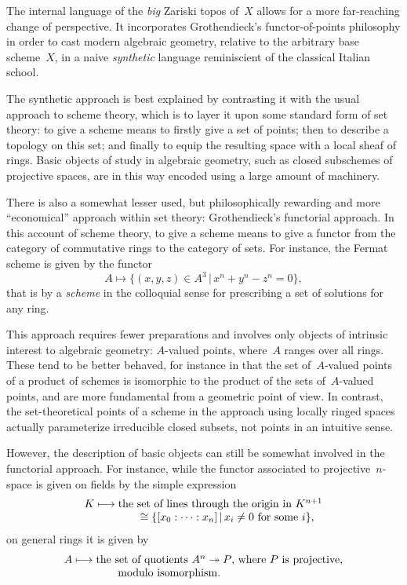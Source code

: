 \documentclass[10pt,reqno,a4paper]{amsbook}
\theoremstyle{definition}
\theoremstyle{plain}
\theoremstyle{remark}
\newcommand{\?}{\,{:}\,}
\renewcommand{\_}{\mathpunct{.}\,}
\begin{document}
{The internal language of the \emph{big} Zariski topos of~$X$ allows for a more far-reaching
change of perspective. It incorporates Grothendieck's functor-of-points
philosophy in order to cast modern algebraic geometry, relative to the arbitrary
base scheme~$X$, in a naive \emph{synthetic} language reminiscient of the classical
Italian school.

The synthetic approach is best explained by contrasting it with the usual
approach to scheme theory, which is to layer it upon some standard form of set theory:
to give a scheme means to firstly give a set of points; then
to describe a topology on this set; and finally to equip the resulting space
with a local sheaf of rings. Basic objects of study in algebraic geometry, such
as closed subschemes of projective spaces, are in this way encoded using a large
amount of machinery.

There is also a somewhat lesser used, but philosophically rewarding and more
``economical'' approach within set theory: Grothendieck's functorial approach.
In this account of scheme theory, to give a scheme means to give a functor
from the category of commutative rings to the category of sets. For instance,
the Fermat scheme is given by the functor
\[ A \longmapsto \{ (x,y,z) \in A^3 \,|\, x^n + y^n - z^n = 0 \}, \]
that is by a \emph{scheme} in the colloquial sense for prescribing a set of
solutions for any ring.

This approach requires fewer preparations and involves
only objects of intrinsic interest to algebraic geometry: $A$-valued points,
where~$A$ ranges over all rings. These tend to be better behaved, for instance in
that the set of~$A$-valued points of a product of schemes is isomorphic to the
product of the sets of~$A$-valued points, and are more fundamental from a
geometric point of view. In contrast, the set-theoretical points of a scheme in
the approach using locally ringed spaces actually parameterize irreducible
closed subsets, not points in an intuitive sense.

However, the description of basic objects can still be somewhat involved in the
functorial approach. For instance, while the functor associated to
projective~$n$-space is given on fields by the simple expression
\[ \begin{array}{r@{}c@{}l}
  K &{}\longmapsto{}& \text{the set of lines through the origin in~$K^{n+1}$} \\
  && \qquad \cong \{ [x_0:\cdots:x_n] \,|\, \text{$x_i \neq 0$ for some~$i$} \},
\end{array} \]
on general rings it is given by
\[ \begin{array}{r@{}c@{}l}
  A &{}\longmapsto{}& \text{the set of quotients~$A^n \twoheadrightarrow P$,
  where~$P$ is projective,} \\
  && \qquad \text{modulo isomorphism}.
\end{array} \]

}
\end{document}
